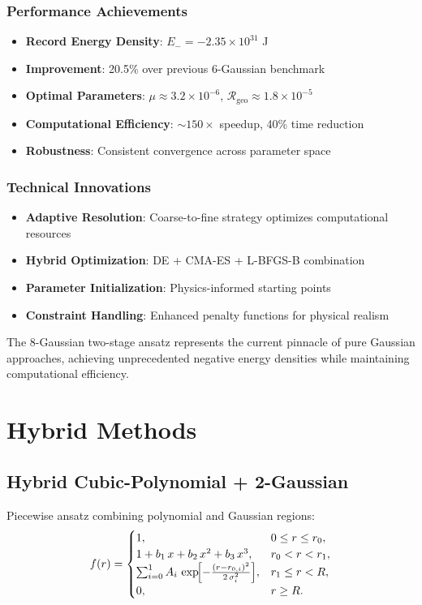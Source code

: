 \documentclass[12pt]{article}
\begin{document}
\subsubsection{Performance Achievements}
\begin{itemize}
\item \textbf{Record Energy Density}: $E_- = -2.35\times10^{31}$ J
\item \textbf{Improvement}: 20.5\% over previous 6-Gaussian benchmark
\item \textbf{Optimal Parameters}: $\mu \approx 3.2\times10^{-6}$, $\mathcal{R}_{\text{geo}} \approx 1.8\times10^{-5}$
\item \textbf{Computational Efficiency}: $\sim150\times$ speedup, 40\% time reduction
\item \textbf{Robustness}: Consistent convergence across parameter space
\end{itemize}

\subsubsection{Technical Innovations}
\begin{itemize}
\item \textbf{Adaptive Resolution}: Coarse-to-fine strategy optimizes computational resources
\item \textbf{Hybrid Optimization}: DE + CMA-ES + L-BFGS-B combination
\item \textbf{Parameter Initialization}: Physics-informed starting points
\item \textbf{Constraint Handling}: Enhanced penalty functions for physical realism
\end{itemize}

The 8-Gaussian two-stage ansatz represents the current pinnacle of pure Gaussian approaches, achieving unprecedented negative energy densities while maintaining computational efficiency.

\section{Hybrid Methods}

\subsection{Hybrid Cubic-Polynomial + 2-Gaussian}
Piecewise ansatz combining polynomial and Gaussian regions:
\[
  f(r) =
  \begin{cases}
    1, & 0 \le r \le r_0,\\
    1 + b_1\,x + b_2\,x^2 + b_3\,x^3, & r_0 < r < r_1,\\
    \sum_{i=0}^{1} A_i\,\exp\!\Bigl[-\tfrac{(r - r_{0,i})^2}{2\,\sigma_i^2}\Bigr], & r_1 \le r < R,\\
    0, & r \ge R.
  \end{cases}
\]
\end{document}

